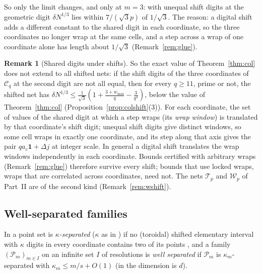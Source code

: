 \documentclass[11pt]{amsart}
\theoremstyle{definition}
\newtheorem{remark}[theorem]{Remark}
\theoremstyle{plain}
\begin{document}
So only the limit changes, and only at $m=3$: with unequal shift digits at the geometric digit $\delta N^{1/3}$ lies within $7/(\sqrt3p)$ of $1/\sqrt3$. The reason: a digital shift adds a different constant to the shared digit in each coordinate, so the three coordinates no longer wrap at the same cells, and a step across a wrap of one coordinate alone has length about $1/\sqrt3$ (Remark~\ref{rem:glue}).

\begin{remark}[Shared digits under shifts]\label{rem:shiftshared}
So the exact value of Theorem~\ref{thm:col} does not extend to all shifted nets: if the shift digits of the three coordinates of $\mathcal C_q$ at the second digit are not all equal, then for every $q\ge11$, prime or not, the shifted net has $\delta N^{1/3}\le\frac1{\sqrt3}(1+\frac{3+w_{\max}}q-\frac3{q^2})$, below the value of Theorem~\ref{thm:col} (Proposition~\ref{prop:colshift}(3)). For each coordinate, the set of values of the shared digit at which a step wraps (its \emph{wrap window}) is translated by that coordinate's shift digit; unequal shift digits give distinct windows, so some cell wraps in exactly one coordinate, and its step along that axis gives the pair $qa_c\mathbf 1+\Delta j$ at integer scale. In general a digital shift translates the wrap windows independently in each coordinate. Bounds certified with arbitrary wraps (Remark~\ref{rem:glue}) therefore survive every shift; bounds that use locked wraps, wraps that are correlated across coordinates, need not. The nets $\mathcal T_p$ and $\mathcal W_p$ of Part~II are of the second kind (Remark~\ref{rem:wshift}).
\end{remark}

\subsection{Well-separated families}
In \cite{DGS2} a point set is \emph{$\kappa$-separated} ($\kappa$ as in \cite{DGS2}) if no (toroidal) shifted elementary interval with $\kappa$ digits in every coordinate contains two of its points \cite[Defs.~3.1--3.3]{DGS2}, and a family $(\mathcal P_m)_{m\in I}$ on an infinite set $I$ of resolutions is \emph{well separated} if $\mathcal P_m$ is $\kappa_m$-separated with $\kappa_m\le m/s+O(1)$ \cite[Def.~3.8]{DGS2} (in \cite{DGS2} the dimension is $d$).
\end{document}
